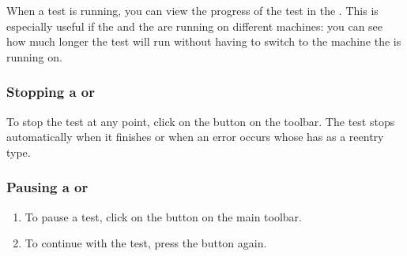 When a test is running, you can view the progress of the test in the . This is especially useful if the \ite{} and the \gdaut{} are running on different machines: you can see how much longer the test will run without having to switch to the machine the \gdaut{} is running on. 

\subsubsection{Stopping a \gdsuite{} or \gdjob{}}

To stop the test at any point, click on the   button on the toolbar. 
The test stops automatically when it finishes or when an error occurs whose \gdehandler{} has  as a reentry type. 

\subsubsection{Pausing a \gdsuite{} or \gdjob{}}
\label{PauseExec}

\begin{enumerate}
\item To pause a test, click on the  button on the main toolbar. 

 \item To continue with the test, press the  button again.
 \end{enumerate}
